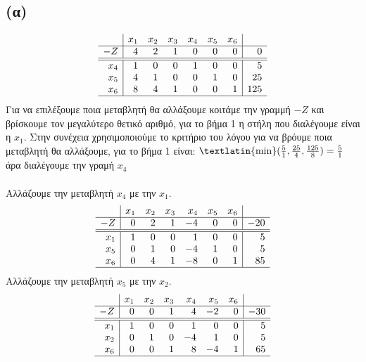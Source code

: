 \documentclass[12pt]{report}
\begin{document}
\subsection*{(α)}
$$
    \begin{array}{r|rrrrrr|r}
            & x_1 & x_2 & x_3 & x_4 & x_5 & x_6 &     \\ \hline
        -Z  & 4   & 2   & 1   & 0   & 0   & 0   & 0   \\ \hline\hline
        x_4 & 1   & 0   & 0   & 1   & 0   & 0   & 5   \\
        x_5 & 4   & 1   & 0   & 0   & 1   & 0   & 25  \\
        x_6 & 8   & 4   & 1   & 0   & 0   & 1   & 125 \\ \hline
    \end{array}
$$
Για να επιλέξουμε ποια μεταβλητή θα αλλάξουμε κοιτάμε την γραμμή $-Z$ και
βρίσκουμε τον μεγαλύτερο
θετικό αριθμό, για το βήμα 1 η στήλη που διαλέγουμε είναι η $x_1$. Στην
συνέχεια χρησιμοποιούμε το κριτήριο του
λόγου για να βρόυμε ποια μεταβλητή θα αλλάξουμε, για το βήμα 1 είναι:
$\text{\textlatin{min}}({\frac{5}{1} ,\frac{25}{4}, \frac{125}{8}}) =
    \frac{5}{1}$ άρα διαλέγουμε την
γραμή $x_4$\\\\
Αλλάζουμε την μεταβλητή $x_4$ με την $x_1$.
$$
    \begin{array}{r|rrrrrr|r}
            & x_1 & x_2 & x_3 & x_4 & x_5 & x_6 &     \\ \hline
        -Z  & 0   & 2   & 1   & -4  & 0   & 0   & -20 \\ \hline\hline
        x_1 & 1   & 0   & 0   & 1   & 0   & 0   & 5   \\
        x_5 & 0   & 1   & 0   & -4  & 1   & 0   & 5   \\
        x_6 & 0   & 4   & 1   & -8  & 0   & 1   & 85  \\ \hline
    \end{array}
$$
Αλλάζουμε την μεταβλητή $x_5$ με την $x_2$.
$$
    \begin{array}{r|rrrrrr|r}
            & x_1 & x_2 & x_3 & x_4 & x_5 & x_6 &     \\ \hline
        -Z  & 0   & 0   & 1   & 4   & -2  & 0   & -30 \\ \hline\hline
        x_1 & 1   & 0   & 0   & 1   & 0   & 0   & 5   \\
        x_2 & 0   & 1   & 0   & -4  & 1   & 0   & 5   \\
        x_6 & 0   & 0   & 1   & 8   & -4  & 1   & 65  \\ \hline
    \end{array}
$$
\end{document}
